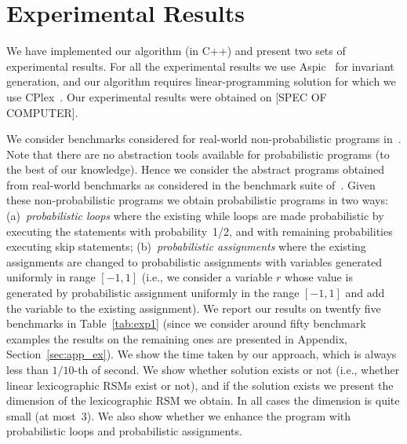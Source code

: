 
\section{Experimental Results}\label{sec:experiments}
We have implemented our algorithm (in C++) and present two sets of experimental results.
For all the experimental results we use Aspic~\cite{} for invariant generation, 
and our algorithm requires linear-programming solution for which we use CPlex~\cite{}.
Our experimental results were obtained on [SPEC OF COMPUTER].


\smallskip{}
We consider benchmarks considered for real-world non-probabilistic programs 
in~\cite{ADFG10:lexicographic}.
Note that there are no abstraction tools available for probabilistic programs (to the
best of our knowledge). 
Hence we consider the abstract programs obtained from real-world benchmarks as 
considered in the benchmark suite of~\cite{ADFG10:lexicographic}.
Given these non-probabilistic programs we obtain probabilistic programs in two ways:
(a)~{\em probabilistic loops} where the existing while loops are made probabilistic 
by executing the statements with probability~1/2, and with remaining probabilities 
executing skip statements;
(b)~{\em probabilistic assignments} where the existing assignments are changed to 
probabilistic assignments with variables generated uniformly in range $[-1,1]$ 
(i.e., we consider a variable $r$ whose value is generated by probabilistic 
assignment uniformly in the range $[-1,1]$ and add the variable to the existing 
assignment).
We report our results on twentfy five benchmarks in Table~\ref{tab:exp1} (since we consider around 
fifty benchmark examples the results on the remaining ones are presented in Appendix, Section~\ref{sec:app_ex}).
We show the time taken by our approach, which is always less than $1/10$-th of second.
We show whether solution exists or not (i.e., whether linear lexicographic RSMs exist
or not), and if the solution exists we present the dimension of the lexicographic RSM
we obtain. In all cases the dimension is quite small (at most~3). 
We also show whether we enhance the program with probabilistic loops and probabilistic assignments.


